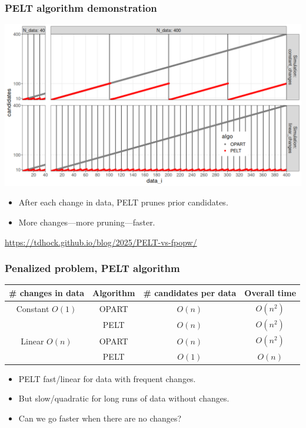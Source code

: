 \documentclass{beamer}
\newcommand{\algo}[1]{\textcolor{#1}{#1}}
\newcommand{\RR}{\mathbb R}
\begin{document}
\begin{frame}
  \frametitle{PELT algorithm demonstration}
  \includegraphics[width=\textwidth]{pelt-prune-1.png}

  \begin{itemize}
  \item After each change in data, PELT prunes prior candidates.
  \item More changes---more pruning---faster.
  \end{itemize}
  
  \url{https://tdhock.github.io/blog/2025/PELT-vs-fpopw/}
\end{frame}

\begin{frame}
  \frametitle{Penalized problem, PELT algorithm}
\begin{tabular}{cccc}
  \# changes in data & Algorithm & \# candidates per data & Overall time \\
  \hline
  Constant $O(1)$ & \algo{OPART} &  $O(n)$ & $O(n^2)$\\
                     & \algo{PELT} &  $O(n)$ & $O(n^2)$\\
  \hline
  Linear $O(n)$ & \algo{OPART} &  $O(n)$ & $O(n^2)$ \\
   & \algo{PELT} &  \textcolor{PELT}{$O(1)$} & \textcolor{PELT}{$O(n)$} \\
\end{tabular}

\begin{itemize}
\item PELT fast/linear for data with frequent changes.
\item But slow/quadratic for long runs of data without changes.
\item Can we go faster when there are no changes?
\end{itemize}
\end{frame}
\end{document}
